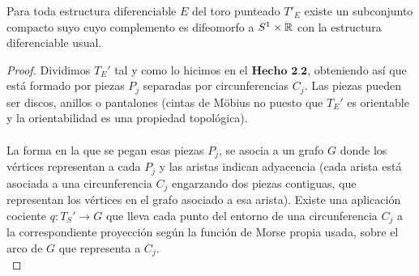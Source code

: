 \begin{hecho}
	Para toda estructura diferenciable $E$ del toro punteado $T'_E$ existe un subconjunto compacto suyo cuyo complemento es difeomorfo a $S^1 \times \mathbb{R}$ con la estructura diferenciable usual.
\end{hecho}

\begin{proof}
	Dividimos $T_E'$ tal y como lo hicimos en el $\textbf{Hecho 2.2}$, obteniendo así que está formado por piezas $P_j$ separadas por circunferencias $C_j$. Las piezas pueden ser discos, anillos o pantalones (cintas de Möbius no puesto que $T_E'$ es orientable y la orientabilidad es una propiedad topológica).\\
	\\ La forma en la que se pegan esas piezas $P_j$, se asocia a un grafo $G$ donde los vértices representan a cada $P_j$ y las aristas indican adyacencia (cada arista está asociada a una circunferencia $C_j$ engarzando dos piezas contiguas, que representan los vértices en el grafo asociado a esa arista). Existe una aplicación cociente $q: T_S' \rightarrow G$ que lleva cada punto del entorno de una circunferencia $C_j$ a la correspondiente proyección según la función de Morse propia usada, sobre el arco de $G$ que representa a $C_j$.\\


\end{proof}
